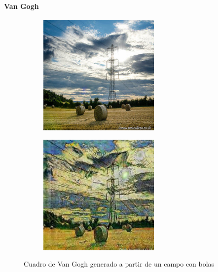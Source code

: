 \documentclass[[../main.tex]{subfiles}
\begin{document}
        \newpage
    
    \paragraph{Van Gogh}
        
        \begin{figure}[!htb]
            \begin{subfigure}[b]{0.49\textwidth}
            \includegraphics[width=0.65\textwidth]{imagenes/imagen2cuadro/dataset/vangogh/2014-08-05 09_28_38.jpg}
            \end{subfigure}
        \hfill
            \begin{subfigure}[b]{0.49\textwidth}
            \includegraphics[width=0.65\textwidth]{imagenes/imagen2cuadro/dataset/vangogh/2014-08-05 09_28_38_2.jpg}
            \end{subfigure}
        \caption{Cuadro de Van Gogh generado a partir de un campo con bolas}
        \label{fig:vangogh_cuadro_campo_bolas}
        \end{figure}
        
\end{document}
